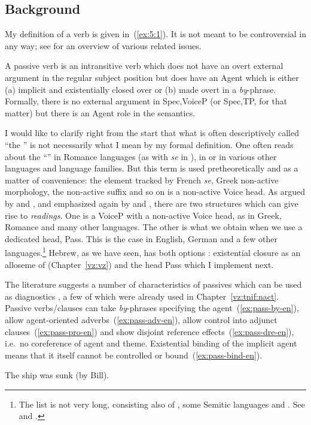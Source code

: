 	\subsection{Background}
My definition of a \textsc{} verb is given in~(\ref{ex:5:1}). It is not meant to be controversial in any way; see \cite{williams15} for an overview of various related issues.
 \begin{exe}
 \ex  \label{ex:5:1}
 \begin{xlist} 
 	\ex  A passive verb is an intransitive verb which does not have an overt external argument in the regular subject position but does have an Agent which is either (a) implicit and existentially closed over or (b) made overt in a \emph{by}-phrase. 
 	\ex  Formally, there is no external argument in Spec,VoiceP (or Spec,TP, for that matter) but there is an Agent role in the semantics. 
 \z
\z 

I would like to clarify right from the start that what is often descriptively called ``the '' is not necessarily what I mean by my formal definition. One often reads about the ``'' in Romance languages (as with \emph{se} in ), in  or in various other languages and language families. But this term is used pretheoretically and as a matter of convenience: the element tracked by French \emph{se}, Greek non-active morphology, the  non-active suffix \citep{lidz01} and so on is a non-active Voice head. As argued by \cite{alexiadoudoron12} and \citet[123]{layering15}, and emphasized again by \cite{spathasetal15} and \cite{kastnerzu17}, there are two structures which can give rise to  \emph{readings}. One is a VoiceP with a non-active Voice head, as in Greek, Romance and many other languages. The other is what we obtain when we use a dedicated  head, Pass. This is the case in English, German and a few other languages.\footnote{The list is not very long, consisting also of , some Semitic languages and . See \cite{klaiman91} and \cite{alexiadoudoron12}.} Hebrew, as we have seen, has both options \citep{alexiadoudoron12}: existential closure as an alloseme of {\vz} (Chapter~\ref{vz:vz}) and the head Pass which I implement next.

The literature suggests a number of characteristics of passives which can be used as diagnostics \citep{bakeretal89,sichel09,spathasetal15}, a few of which were already used in Chapter~\ref{vz:tnif:nact}. Passive verbs/clauses can take \emph{by}-phrases specifying the agent~(\ref{ex:pass-by-en}), allow agent-oriented adverbs~(\ref{ex:pass-adv-en}), allow control into adjunct clauses~(\ref{ex:pass-pro-en}) and show disjoint reference effects~(\ref{ex:pass-dre-en}), i.e.~no coreference of agent and theme. Existential binding of the implicit agent means that it itself cannot be controlled or bound~(\ref{ex:pass-bind-en}).
 \begin{exe}
\ex  \label{ex:pass-by-en}The ship was sunk (by Bill). 


\end{exe}
\end{xlist}
\end{exe}
